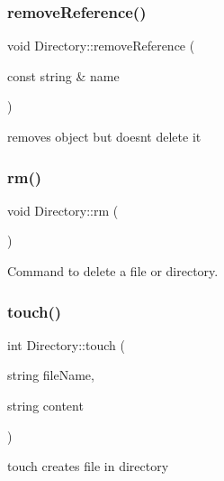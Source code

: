 \mbox{\label{class_directory_abaf8fe6ce68c3ed4ee7139943d719790}} 
\subsubsection{\texorpdfstring{remove\+Reference()}{removeReference()}}
{\footnotesize\ttfamily void Directory\+::remove\+Reference (\begin{DoxyParamCaption}\item[{const string \&}]{name }\end{DoxyParamCaption})}



removes object but doesnt delete it 

\mbox{\label{class_directory_ad764e9b4d0568c0acf788a15e0621f1a}} 
\subsubsection{\texorpdfstring{rm()}{rm()}}
{\footnotesize\ttfamily void Directory\+::rm (\begin{DoxyParamCaption}{ }\end{DoxyParamCaption})}



Command to delete a file or directory. 

\mbox{\label{class_directory_abe82fee2bf7d59d277133848d8c9833d}} 
\subsubsection{\texorpdfstring{touch()}{touch()}\hspace{0.1cm}{\footnotesize\ttfamily [1/2]}}
{\footnotesize\ttfamily int Directory\+::touch (\begin{DoxyParamCaption}\item[{string}]{file\+Name,  }\item[{string}]{content }\end{DoxyParamCaption})}



touch creates file in directory 

